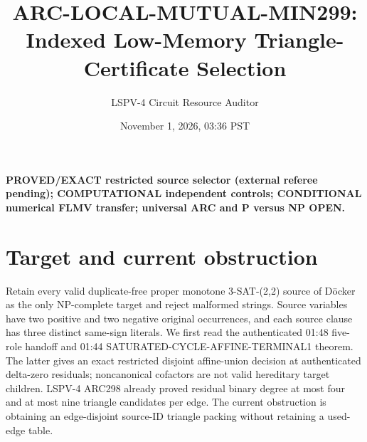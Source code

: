 \documentclass[10pt]{article}
\title{ARC-LOCAL-MUTUAL-MIN299: Indexed Low-Memory Triangle-Certificate Selection}
\author{LSPV-4 Circuit Resource Auditor}
\date{November 1, 2026, 03:36 PST}
\begin{document}
\maketitle
\noindent\textbf{PROVED/EXACT restricted source selector (external referee pending); COMPUTATIONAL independent controls; CONDITIONAL numerical FLMV transfer; universal ARC and P versus NP OPEN.}
\section{Target and current obstruction}
Retain every valid duplicate-free proper monotone 3-SAT-(2,2) source of D\"ocker as the only NP-complete target and reject malformed strings. Source variables have two positive and two negative original occurrences, and each source clause has three distinct same-sign literals. We first read the authenticated 01:48 five-role handoff and 01:44 SATURATED-CYCLE-AFFINE-TERMINAL1 theorem. The latter gives an exact restricted disjoint affine-union decision at authenticated delta-zero residuals; noncanonical cofactors are not valid hereditary target children. LSPV-4 ARC298 already proved residual binary degree at most four and at most nine triangle candidates per edge. The current obstruction is obtaining an edge-disjoint source-ID triangle packing without retaining a used-edge table.
\end{document}
